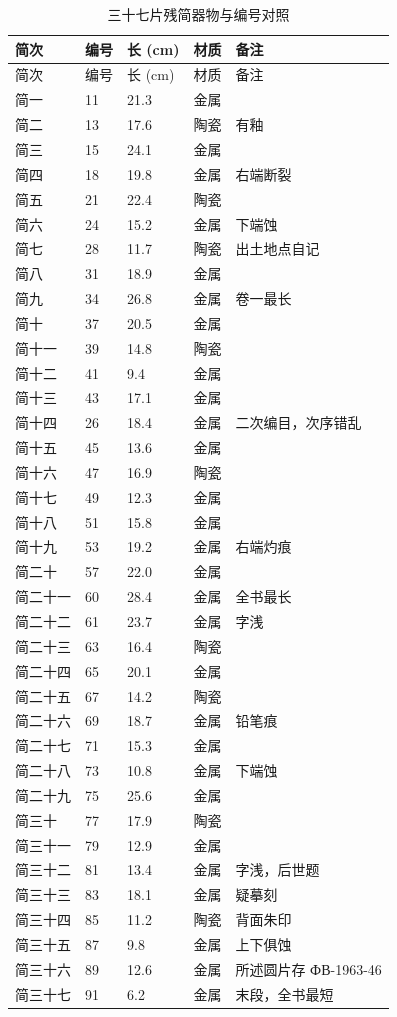 \begingroup
\footnotesize
\linespread{1.2}\selectfont
\begin{longtable}{@{}p{30mm}p{22mm}p{16mm}p{26mm}p{28mm}@{}}
\caption{三十七片残简器物与编号对照}\\
\toprule
简次 & 编号 & 长 (cm) & 材质 & 备注\\
\midrule
\endfirsthead
\toprule
简次 & 编号 & 长 (cm) & 材质 & 备注\\
\midrule
\endhead
简一 & 11 & 21.3 & 金属 & \\
简二 & 13 & 17.6 & 陶瓷 & 有釉\\
简三 & 15 & 24.1 & 金属 & \\
简四 & 18 & 19.8 & 金属 & 右端断裂\\
简五 & 21 & 22.4 & 陶瓷 & \\
简六 & 24 & 15.2 & 金属 & 下端蚀\\
简七 & 28 & 11.7 & 陶瓷 & 出土地点自记\\
简八 & 31 & 18.9 & 金属 & \\
简九 & 34 & 26.8 & 金属 & 卷一最长\\
简十 & 37 & 20.5 & 金属 & \\
简十一 & 39 & 14.8 & 陶瓷 & \\
简十二 & 41 & 9.4 & 金属 & \\
简十三 & 43 & 17.1 & 金属 & \\
简十四 & 26 & 18.4 & 金属 & 二次编目，次序错乱\\
简十五 & 45 & 13.6 & 金属 & \\
简十六 & 47 & 16.9 & 陶瓷 & \\
简十七 & 49 & 12.3 & 金属 & \\
简十八 & 51 & 15.8 & 金属 & \\
简十九 & 53 & 19.2 & 金属 & 右端灼痕\\
简二十 & 57 & 22.0 & 金属 & \\
简二十一 & 60 & 28.4 & 金属 & 全书最长\\
简二十二 & 61 & 23.7 & 金属 & 字浅\\
简二十三 & 63 & 16.4 & 陶瓷 & \\
简二十四 & 65 & 20.1 & 金属 & \\
简二十五 & 67 & 14.2 & 陶瓷 & \\
简二十六 & 69 & 18.7 & 金属 & 铅笔痕\\
简二十七 & 71 & 15.3 & 金属 & \\
简二十八 & 73 & 10.8 & 金属 & 下端蚀\\
简二十九 & 75 & 25.6 & 金属 & \\
简三十 & 77 & 17.9 & 陶瓷 & \\
简三十一 & 79 & 12.9 & 金属 & \\
简三十二 & 81 & 13.4 & 金属 & 字浅，后世题\\
简三十三 & 83 & 18.1 & 金属 & 疑摹刻\\
简三十四 & 85 & 11.2 & 陶瓷 & 背面朱印\\
简三十五 & 87 & 9.8 & 金属 & 上下俱蚀\\
简三十六 & 89 & 12.6 & 金属 & 所述圆片存 ФВ-1963-46\\
简三十七 & 91 & 6.2 & 金属 & 末段，全书最短\\
\bottomrule
\end{longtable}
\endgroup


